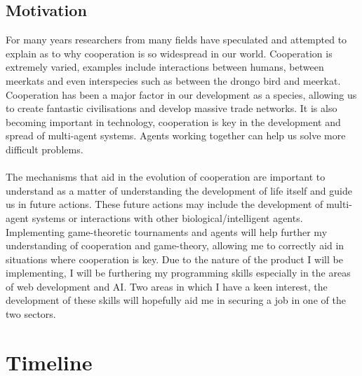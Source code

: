 \documentclass{article}
\begin{document}
\subsection*{Motivation}
For many years researchers from many fields have speculated and attempted to explain as to why cooperation is so widespread in our world. Cooperation is extremely varied, examples include interactions between humans, between meerkats and even interspecies such as between the drongo bird and meerkat. Cooperation has been a major factor in our development as a species, allowing us to create fantastic civilisations and develop massive trade networks. It is also becoming important in technology, cooperation is key in the development and spread of multi-agent systems. Agents working together can help us solve more difficult problems.\\\\
The mechanisms that aid in the evolution of cooperation are important to understand as a matter of understanding the development of life itself and guide us in future actions. These future actions may include the development of multi-agent systems or interactions with other biological/intelligent agents. Implementing game-theoretic tournaments and agents will help further my understanding of cooperation and game-theory, allowing me to correctly aid in situations where cooperation is key. Due to the nature of the product I will be implementing, I will be furthering my programming skills especially in the areas of web development and AI. Two areas in which I have a keen interest, the development of these skills will hopefully aid me in securing a job in one of the two sectors.

\section*{Timeline}
\end{document}
